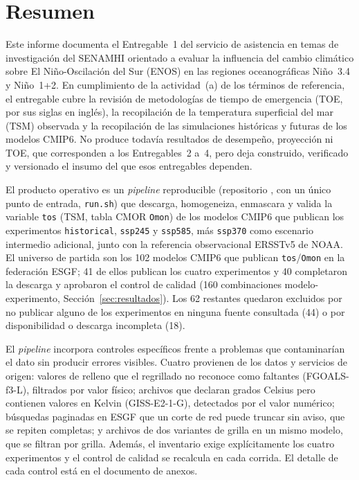 \section{Resumen}
\label{sec:resumen}

Este informe documenta el Entregable~1 del servicio de asistencia en temas de investigación del SENAMHI orientado a evaluar la influencia del cambio climático sobre El Niño-Oscilación del Sur (ENOS) en las regiones oceanográficas Niño~3.4 y Niño~1+2. En cumplimiento de la actividad~(a) de los términos de referencia, el entregable cubre la revisión de metodologías de tiempo de emergencia (TOE, por sus siglas en inglés), la recopilación de la temperatura superficial del mar (TSM) observada y la recopilación de las simulaciones históricas y futuras de los modelos CMIP6. No produce todavía resultados de desempeño, proyección ni TOE, que corresponden a los Entregables~2 a~4, pero deja construido, verificado y versionado el insumo del que esos entregables dependen.

El producto operativo es un \emph{pipeline} reproducible (repositorio , con un único punto de entrada, \texttt{run.sh}) que descarga, homogeneiza, enmascara y valida la variable \texttt{tos} (TSM, tabla CMOR \texttt{Omon}) de los modelos CMIP6 que publican los experimentos \texttt{historical}, \texttt{ssp245} y \texttt{ssp585}, más \texttt{ssp370} como escenario intermedio adicional, junto con la referencia observacional ERSSTv5 de NOAA. El universo de partida son los 102 modelos CMIP6 que publican \texttt{tos}/\texttt{Omon} en la federación ESGF; 41 de ellos publican los cuatro experimentos y 40 completaron la descarga y aprobaron el control de calidad (160 combinaciones modelo-experimento, Sección~\ref{sec:resultados}). Los 62 restantes quedaron excluidos por no publicar alguno de los experimentos en ninguna fuente consultada (44) o por disponibilidad o descarga incompleta (18).

El \emph{pipeline} incorpora controles específicos frente a problemas que contaminarían el dato sin producir errores visibles. Cuatro provienen de los datos y servicios de origen: valores de relleno que el regrillado no reconoce como faltantes (FGOALS-f3-L), filtrados por valor físico; archivos que declaran grados Celsius pero contienen valores en Kelvin (GISS-E2-1-G), detectados por el valor numérico; búsquedas paginadas en ESGF que un corte de red puede truncar sin aviso, que se repiten completas; y archivos de dos variantes de grilla en un mismo modelo, que se filtran por grilla. Además, el inventario exige explícitamente los cuatro experimentos y el control de calidad se recalcula en cada corrida. El detalle de cada control está en el documento de anexos.

